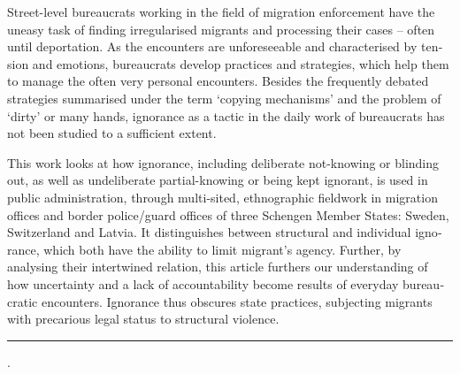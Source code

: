     \begin{adjustwidth}{20mm}{20mm}
\label{paper4:abstract}
    \bigskip
    \begin{otherlanguage}{english}
    {\small

\noindent Street-level bureaucrats working in the field of migration enforcement have the uneasy task of finding irregularised migrants and processing their cases – often until deportation. As the encounters are unforeseeable and characterised by tension and emotions, bureaucrats develop practices and strategies, which help them to manage the often very personal encounters. Besides the frequently debated strategies summarised under the term ‘copying mechanisms’ and the problem of ‘dirty’ or many hands, ignorance as a tactic in the daily work of bureaucrats has not been studied to a sufficient extent.
\par
This work looks at how ignorance, including  deliberate not-knowing or blinding out, as well as undeliberate partial-knowing or being kept ignorant, is used in public administration, through multi-sited, ethnographic fieldwork in migration offices and border police/guard offices of three Schengen Member States: Sweden, Switzerland and Latvia. It distinguishes between structural and individual ignorance, which both have the ability to limit migrant’s agency. Further, by analysing their intertwined relation, this article furthers our understanding of how uncertainty and a lack of accountability become results of everyday bureaucratic encounters. Ignorance thus  obscures state practices, subjecting migrants with precarious legal status  to structural violence.

\smallskip
\noindent\rule{\linewidth}{1pt}

%
\hspace*{0.75em}{%
bureaucracy;
agnotology;
ignorance;
migration;
public administration;
discretion}.





    } %


    \end{otherlanguage}

    \end{adjustwidth}
